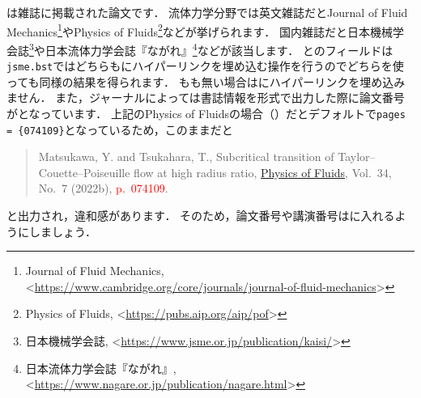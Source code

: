 \documentclass[a4paper,fleqn,uplatex,dvipdfmx]{jsarticle}
\newcommand{\jsmefile}{\texttt{jsme.bst}}
\begin{document}
\ttarticle は雑誌に掲載された論文です．
流体力学分野では英文雑誌だとJournal of Fluid Mechanics\footnote{Journal of Fluid Mechanics, \textless\url{https://www.cambridge.org/core/journals/journal-of-fluid-mechanics}\textgreater}やPhysics of Fluids\footnote{Physics of Fluids, \textless\url{https://pubs.aip.org/aip/pof}\textgreater}などが挙げられます．
国内雑誌だと日本機械学会誌\footnote{日本機械学会誌, \textless\url{https://www.jsme.or.jp/publication/kaisi/}\textgreater}や日本流体力学会誌『ながれ』\footnote{日本流体力学会誌『ながれ』, \textless\url{https://www.nagare.or.jp/publication/nagare.html}\textgreater}などが該当します．
\ttdoi と\tturl のフィールドは\jsmefile ではどちらも\ttjournal にハイパーリンクを埋め込む操作を行うのでどちらを使っても同様の結果を得られます．
\ttdoi も\tturl も無い場合は\ttjournal にハイパーリンクを埋め込みません．
また，ジャーナルによっては書誌情報を\BibTeX{}形式で出力した際に論文番号が\ttpages となっています．
上記のPhysics of Fluidsの場合（\citealp{Matsukawa:PoF2022}）だとデフォルトで\verb|pages = {074109}|となっているため，このままだと
\begin{quote}
    Matsukawa, Y. and Tsukahara, T., Subcritical transition of Taylor--Couette--Poiseuille flow at high radius ratio, \href{https://doi.org/10.1063/5.0096676}{Physics of Fluids}, Vol.~34, No.~7 (2022b), \textcolor{red}{p.~074109}.
\end{quote}
と出力され，違和感があります．
そのため，論文番号や講演番号は\ttnote に入れるようにしましょう．
\end{document}
